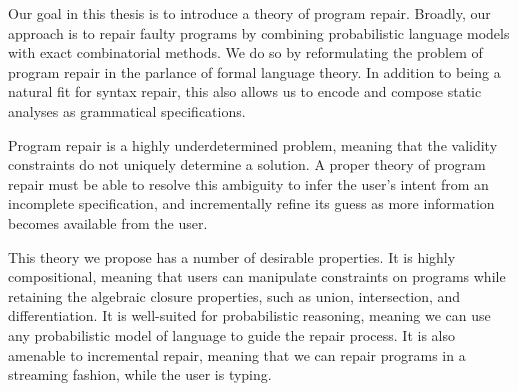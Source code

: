 
Our goal in this thesis is to introduce a theory of program repair. Broadly, our approach is to repair faulty programs by combining probabilistic language models with exact combinatorial methods. We do so by reformulating the problem of program repair in the parlance of formal language theory. In addition to being a natural fit for syntax repair, this also allows us to encode and compose static analyses as grammatical specifications.

Program repair is a highly underdetermined problem, meaning that the validity constraints do not uniquely determine a solution. A proper theory of program repair must be able to resolve this ambiguity to infer the user's intent from an incomplete specification, and incrementally refine its guess as more information becomes available from the user.

This theory we propose has a number of desirable properties. It is highly compositional, meaning that users can manipulate constraints on programs while retaining the algebraic closure properties, such as union, intersection, and differentiation. It is well-suited for probabilistic reasoning, meaning we can use any probabilistic model of language to guide the repair process. It is also amenable to incremental repair, meaning that we can repair programs in a streaming fashion, while the user is typing.